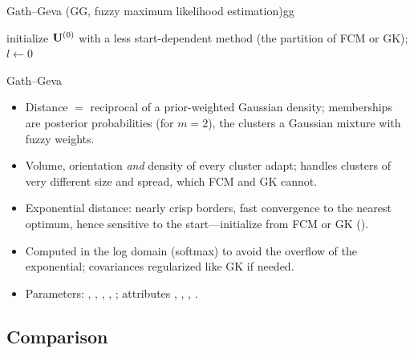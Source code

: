 \begin{algobox}{Gath--Geva (GG, fuzzy maximum likelihood estimation)}{gg}
\begin{algorithm}[H]
initialize $\mathbf{U}^{(0)}$ with a less start-dependent method (the partition of FCM or GK); $l\leftarrow0$\;
\end{algorithm}
\end{algobox}
\begin{summarybox}{Gath--Geva}
\begin{itemize}
  \item Distance $=$ reciprocal of a prior-weighted Gaussian density; memberships are posterior probabilities (for $m=2$), the clusters a Gaussian mixture with fuzzy weights.
  \item Volume, orientation \emph{and} density of every cluster adapt; handles clusters of very different size and spread, which FCM and GK cannot.
  \item Exponential distance: nearly crisp borders, fast convergence to the nearest optimum, hence sensitive to the start---initialize from FCM or GK ().
  \item Computed in the log domain (softmax) to avoid the overflow of the exponential; covariances regularized like GK if needed.
  \item Parameters: , , , , ; attributes , , , .
\end{itemize}
\end{summarybox}

\subsection{Comparison}\label{sec:part:comparison}

